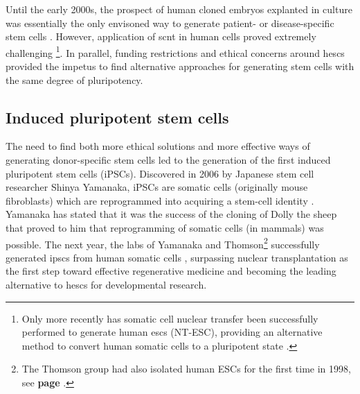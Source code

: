 

Until the early 2000s, the prospect of human cloned embryos explanted in culture was essentially the only envisoned way to generate patient- or disease-specific stem cells \cite{yamanaka2007strategies}.
However, application of \gls{scnt} in human cells proved extremely challenging \cite{fulka2013ups}\footnote{Only more recently has somatic cell nuclear transfer been successfully performed to generate human \glspl{esc} (NT-ESC), providing an alternative method to convert human somatic cells to a pluripotent state \cite{tachibana2013human}.}. 
In parallel, funding restrictions and ethical concerns around \glspl{hesc} provided the impetus to find alternative approaches for generating stem cells with the same degree of pluripotency.

\subsection{Induced pluripotent stem cells}
\label{sec:ipsc}

The need to find both more ethical solutions and more effective ways of generating donor-specific stem cells  led to the generation of the first induced pluripotent stem cells (iPSCs).
Discovered in 2006 by Japanese stem cell researcher Shinya Yamanaka, iPSCs are somatic cells (originally mouse fibroblasts) which are reprogrammed into acquiring a stem-cell identity \cite{takahashi2006induction}.
Yamanaka has stated that it was the success of the cloning of Dolly the sheep that proved to him that reprogramming of somatic cells (in mammals) was possible.
The next year, the labs of Yamanaka and Thomson\footnote{The Thomson group had also isolated human ESCs for the first time in 1998, see \textbf{page \pageref{sec:esc_induction}}.} successfully generated \glspl{ipsc} from human somatic cells \cite{takahashi2006induction, takahashi2007induction, yu2007induced}, surpassing nuclear transplantation as the first step toward effective regenerative medicine and becoming the leading alternative to \glspl{hesc} for developmental research.\\

